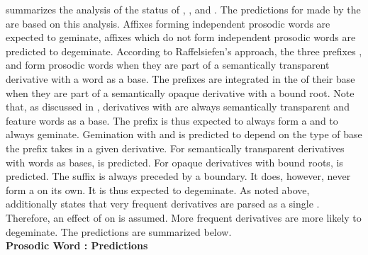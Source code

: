 summarizes the analysis of the  status of  , ,  and . The predictions for  made by the  are based on this analysis. Affixes forming independent prosodic words are expected to geminate, affixes which do not form independent prosodic words are predicted to degeminate.
According to Raffelsiefen's approach, the three prefixes ,  and  form prosodic words when they are part of a semantically transparent derivative with a word as a base. The prefixes are integrated in the  of their base when they are part of a semantically opaque derivative with a bound root. 
Note that, as discussed in , derivatives with  are always semantically transparent and feature words as a base. The prefix  is thus expected to always form a  and to always geminate. 
Gemination with  and  is predicted to depend on the type of base the prefix takes in a given derivative. For semantically transparent derivatives with words as bases,  is predicted. For opaque derivatives with bound roots,  is predicted.
The suffix  is always preceded by a  boundary. It does, however, never form a  on its own. It is thus expected to degeminate. 
As noted above, \cite{Raffelsiefen.1999} additionally states that very frequent derivatives are parsed as a single . Therefore, an effect of  on  is assumed. More frequent derivatives are more likely to degeminate. The predictions are summarized below.\\




\textbf{Prosodic Word \citep{Raffelsiefen.1999}: Predictions}


